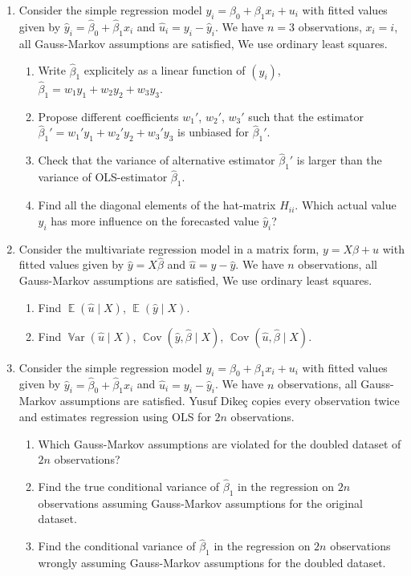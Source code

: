 \documentclass[12pt]{article}
\DeclareMathOperator{\Cov}{\mathbb{C}ov}
\DeclareMathOperator{\Var}{\mathbb{V}ar}
\DeclareMathOperator{\E}{\mathbb{E}}
\newcommand{\hb}{\hat\beta}
\begin{document}
\begin{enumerate}
\item Consider the simple regression model $y_i = \beta_0 + \beta_1 x_i + u_i$ with fitted values given by $\hat y_i = \hb_0 + \hb_1 x_i$ and $\hat u_i = y_i - \hat y_i$.
We have $n = 3$ observations, $x_i = i$, all Gauss-Markov assumptions are satisfied,
We use ordinary least squares.
\begin{enumerate}
    \item Write $\hb_1$ explicitely as a linear function of $(y_i)$, $\hb_1 = w_1 y_1 + w_2 y_2 + w_3 y_3$.
    \item Propose different coefficients $w_1'$, $w_2'$, $w_3'$ such that the estimator $\hb_1' =  w_1' y_1 + w_2' y_2 + w_3' y_3$ is unbiased for $\hb_1'$.
    \item Check that the variance of alternative estimator $\hb_1'$ is larger than the variance of OLS-estimator $\hb_1$.
    \item Find all the diagonal elements of the hat-matrix $H_{ii}$. 
    Which actual value $y_i$ has more influence on the forecasted value $\hat y_i$?
\end{enumerate}


\item Consider the multivariate regression model in a matrix form, $y = X\beta + u$ with fitted values given by $\hat y = X\hb$ and $\hat u = y - \hat y$.
We have $n$ observations, all Gauss-Markov assumptions are satisfied,
We use ordinary least squares.

\begin{enumerate}
    \item Find $\E(\hat u \mid X)$, $\E(\hat y \mid X)$.
    \item Find $\Var(\hat u \mid X)$, $\Cov(\hat y, \hb \mid X)$, $\Cov(\hat u, \hb \mid X)$.
\end{enumerate}

\item Consider the simple regression model $y_i = \beta_0 + \beta_1 x_i + u_i$ with fitted values given by $\hat y_i = \hb_0 + \hb_1 x_i$ and $\hat u_i = y_i - \hat y_i$.
We have $n$ observations, all Gauss-Markov assumptions are satisfied.
Yusuf Dikeç copies every observation twice and estimates regression using OLS for $2n$ observations. 

\begin{enumerate}
    \item Which Gauss-Markov assumptions are violated for the doubled dataset of $2n$ observations?
    \item Find the true conditional variance of $\hb_1$ in the regression on $2n$ observations assuming Gauss-Markov assumptions for the original dataset.
    \item Find the conditional variance of $\hb_1$ in the regression on $2n$ observations wrongly assuming Gauss-Markov assumptions for the doubled dataset.
\end{enumerate}

\end{enumerate}
\end{document}
